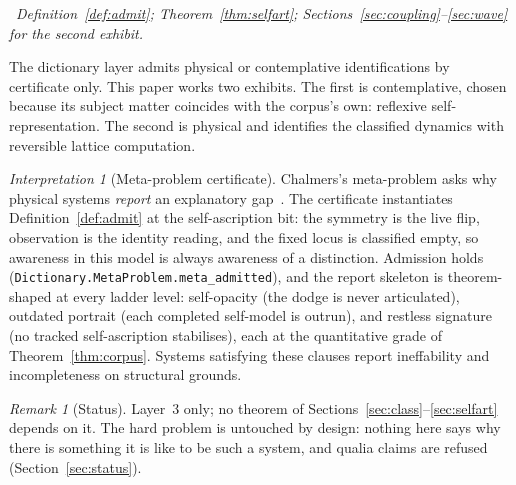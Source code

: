 \documentclass[11pt,a4paper]{article}
\theoremstyle{plain}
\theoremstyle{definition}
\theoremstyle{remark}
\newtheorem{remark}[theorem]{Remark}
\newtheorem{interpretation}[theorem]{Interpretation}
\newcommand{\dep}[1]{%
  \par\noindent{\small\color{muted}\sffamily Dependence:}~\textit{#1}\par\medskip}
\begin{document}
\dep{Definition~\ref{def:admit}; Theorem~\ref{thm:selfart};
Sections~\ref{sec:coupling}--\ref{sec:wave} for the second exhibit.}

The dictionary layer admits physical or contemplative identifications
by certificate only. This paper works two exhibits. The first is
contemplative, chosen because its subject matter coincides with the
corpus's own: reflexive self-representation. The second is physical
and identifies the classified dynamics with reversible lattice
computation.

\begin{interpretation}[Meta-problem certificate]
\label{int:dict}
Chalmers's meta-problem asks why physical systems \emph{report} an
explanatory gap~\cite{chalmers}. The certificate instantiates
Definition~\ref{def:admit} at the self-ascription bit: the symmetry is
the live flip, observation is the identity reading, and the fixed locus
is classified empty, so awareness in this model is always awareness of
a distinction. Admission holds
(\texttt{Dictionary.MetaProblem.meta\_admitted}), and the report
skeleton is theorem-shaped at every ladder level: self-opacity (the
dodge is never articulated), outdated portrait (each completed
self-model is outrun), and restless signature (no tracked
self-ascription stabilises), each at the quantitative grade of
Theorem~\ref{thm:corpus}. Systems satisfying these clauses report
ineffability and incompleteness on structural grounds.
\end{interpretation}

\begin{remark}[Status]
Layer~3 only; no theorem of Sections~\ref{sec:class}--\ref{sec:selfart}
depends on it. The hard problem is untouched by design: nothing here
says why there is something it is like to be such a system, and qualia
claims are refused (Section~\ref{sec:status}).
\end{remark}
\end{document}
